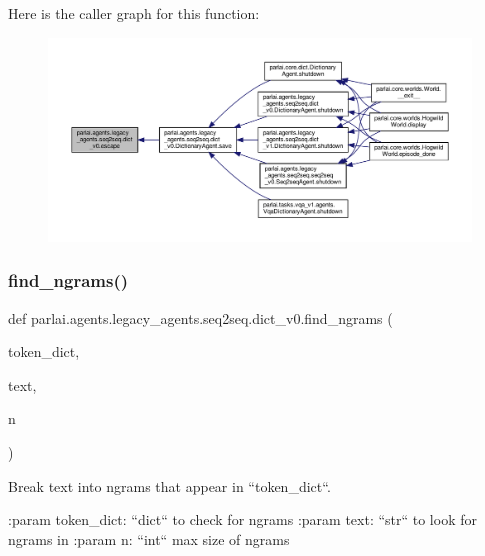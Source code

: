 Here is the caller graph for this function\+:
\nopagebreak
\begin{figure}[H]
\begin{center}
\leavevmode
\includegraphics[width=350pt]{namespaceparlai_1_1agents_1_1legacy__agents_1_1seq2seq_1_1dict__v0_a50d891f5daa90cde2858723889ab0cc8_icgraph}
\end{center}
\end{figure}
\mbox{\label{namespaceparlai_1_1agents_1_1legacy__agents_1_1seq2seq_1_1dict__v0_aa7398720bbf0f8e82c5b1495313f4f8b}} 
\subsubsection{\texorpdfstring{find\+\_\+ngrams()}{find\_ngrams()}}
{\footnotesize\ttfamily def parlai.\+agents.\+legacy\+\_\+agents.\+seq2seq.\+dict\+\_\+v0.\+find\+\_\+ngrams (\begin{DoxyParamCaption}\item[{}]{token\+\_\+dict,  }\item[{}]{text,  }\item[{}]{n }\end{DoxyParamCaption})}

\begin{DoxyVerb}Break text into ngrams that appear in ``token_dict``.

:param token_dict: ``dict`` to check for ngrams
:param text: ``str`` to look for ngrams in
:param n: ``int`` max size of ngrams
\end{DoxyVerb}
 

